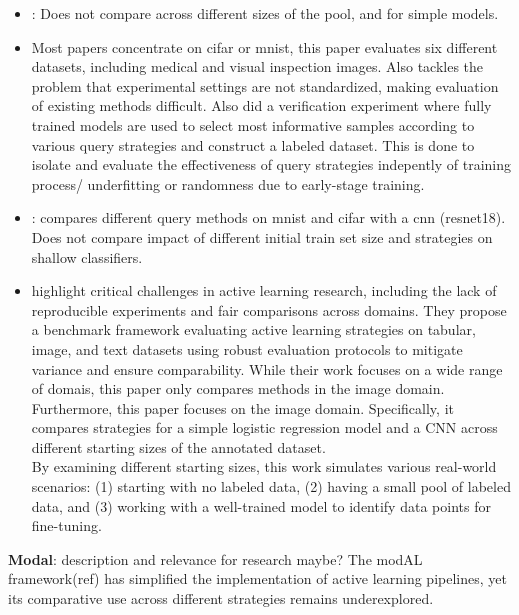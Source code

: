 \documentclass{article}
\theoremstyle{plain}
\theoremstyle{definition}
\theoremstyle{remark}
\begin{document}
\begin{itemize}
	\item \cite{revisitinguncertaintybasedquerystrategies}: Does not compare across different sizes of the pool, and for simple models.
	\item \cite{benchmarkingofquerystrategies} Most papers concentrate on cifar or mnist, this paper evaluates six different datasets, including medical and visual inspection images. Also tackles the problem that experimental settings are not standardized, making evaluation of existing methods difficult. Also did a verification experiment where fully trained models are used to select most informative samples according to various query strategies and construct a labeled dataset. This is done to isolate and evaluate the effectiveness of query strategies indepently of training process/ underfitting or randomness due to early-stage training. 

	\item \cite{comparativesurveydeepactive}: compares different query methods on mnist and cifar with a cnn (resnet18). Does not compare impact of different initial train set size and strategies on shallow classifiers.


	\item \cite{comparableactivelearning} highlight critical challenges in active learning research, including the lack of reproducible experiments and fair comparisons across domains. They propose a benchmark framework evaluating active learning strategies on tabular, image, and text datasets using robust evaluation protocols to mitigate variance and ensure comparability. While their work focuses on a wide range of domais, this paper only compares methods in the image domain. Furthermore, this paper focuses on the image domain. Specifically, it compares strategies for a simple logistic regression model and a CNN across different starting sizes of the annotated dataset. \\
	By examining different starting sizes, this work simulates various real-world scenarios: (1) starting with no labeled data, (2) having a small pool of labeled data, and (3) working with a well-trained model to identify data points for fine-tuning.
\end{itemize}

\textbf{Modal}: description and relevance for research maybe? The modAL framework(ref) has simplified the implementation of active learning pipelines, yet its comparative use across different strategies remains underexplored.
\end{document}

